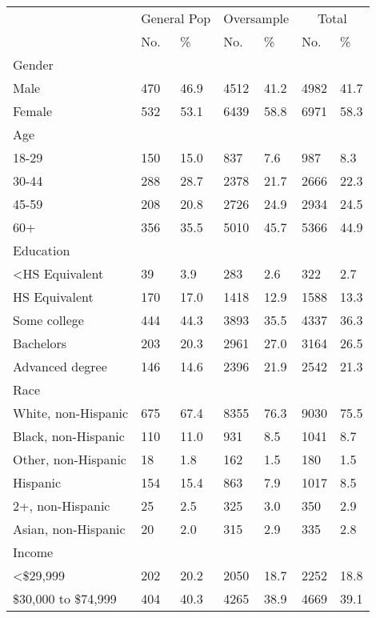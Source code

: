 \captionsetup[table]{labelformat=empty,skip=1pt}
\begin{longtable}{lllllll}
\toprule
 & \multicolumn{2}{c}{General Pop} & \multicolumn{2}{c}{Oversample} & \multicolumn{2}{c}{Total} \\ 
 \cmidrule(lr){2-3} \cmidrule(lr){4-5} \cmidrule(lr){6-7}
 & No. & \% & No. & \% & No. & \% \\ 
\midrule
\multicolumn{1}{l}{Gender} \\ 
\midrule
Male & 470 & 46.9 & 4512 & 41.2 & 4982 & 41.7 \\ 
Female & 532 & 53.1 & 6439 & 58.8 & 6971 & 58.3 \\ 
\midrule
\multicolumn{1}{l}{Age} \\ 
\midrule
18-29 & 150 & 15.0 & 837 & 7.6 & 987 & 8.3 \\ 
30-44 & 288 & 28.7 & 2378 & 21.7 & 2666 & 22.3 \\ 
45-59 & 208 & 20.8 & 2726 & 24.9 & 2934 & 24.5 \\ 
60+ & 356 & 35.5 & 5010 & 45.7 & 5366 & 44.9 \\ 
\midrule
\multicolumn{1}{l}{Education} \\ 
\midrule
<HS Equivalent & 39 & 3.9 & 283 & 2.6 & 322 & 2.7 \\ 
HS Equivalent & 170 & 17.0 & 1418 & 12.9 & 1588 & 13.3 \\ 
Some college & 444 & 44.3 & 3893 & 35.5 & 4337 & 36.3 \\ 
Bachelors & 203 & 20.3 & 2961 & 27.0 & 3164 & 26.5 \\ 
Advanced degree & 146 & 14.6 & 2396 & 21.9 & 2542 & 21.3 \\ 
\midrule
\multicolumn{1}{l}{Race} \\ 
\midrule
White, non-Hispanic & 675 & 67.4 & 8355 & 76.3 & 9030 & 75.5 \\ 
Black, non-Hispanic & 110 & 11.0 & 931 & 8.5 & 1041 & 8.7 \\ 
Other, non-Hispanic & 18 & 1.8 & 162 & 1.5 & 180 & 1.5 \\ 
Hispanic & 154 & 15.4 & 863 & 7.9 & 1017 & 8.5 \\ 
2+, non-Hispanic & 25 & 2.5 & 325 & 3.0 & 350 & 2.9 \\ 
Asian, non-Hispanic & 20 & 2.0 & 315 & 2.9 & 335 & 2.8 \\ 
\midrule
\multicolumn{1}{l}{Income} \\ 
\midrule
<\$29,999 & 202 & 20.2 & 2050 & 18.7 & 2252 & 18.8 \\ 
\$30,000 to \$74,999 & 404 & 40.3 & 4265 & 38.9 & 4669 & 39.1 \\ 

\end{longtable}
